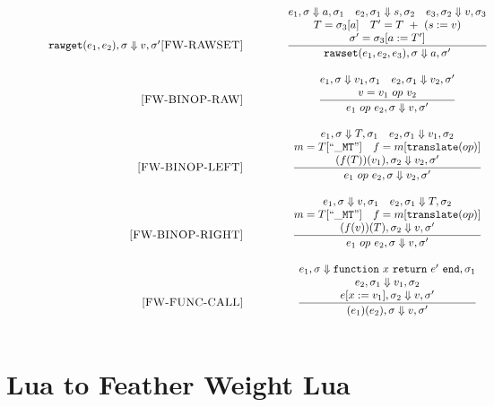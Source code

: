 \documentclass{article}
\begin{document}
\begin{figure}[P]
\[\begin{array}{r@{\qquad\qquad}c}
{}{
  \semanticFull {{\tt rawget}(e_1,e_2)} {\sigma}   {v} {\sigma'}
}
\ssrule{FW-RAWSET}{
  \semanticFull{e_1}{\sigma}{a}{\sigma_1} \quad
  \semanticFull{e_2}{\sigma_1}{s}{\sigma_2} \quad
  \semanticFull{e_3}{\sigma_2}{v}{\sigma_3} \\
  T = \sigma_3[a] \quad
  T' = T~+~(s := v) \\
  \sigma' = \sigma_3[a:=T']
}{
  \semanticFull{{\tt rawset}(e_1,e_2,e_3)}{\sigma}{a}{\sigma'}
}
\ssrule{FW-BINOP-RAW}{
  \semanticFull{e_1}{\sigma}{v_1}{\sigma_1} \quad
  \semanticFull{e_2}{\sigma_1}{v_2}{\sigma'} \\
  v = v_1 ~op~ v_2
}{
  \semanticFull{e_1 ~op~ e_2}{\sigma}{v}{\sigma'}
}
\ssrule{FW-BINOP-LEFT}{
  \semanticFull{e_1}{\sigma}{T}{\sigma_1} \quad
  \semanticFull{e_2}{\sigma_1}{v_1}{\sigma_2} \\
  m = T[{\tt ``{\_}MT"}]\quad
  f = m[{\tt translate}(op)]\\
   \semanticFull{(f(T))(v_1)}  {\sigma_2}    {v_2} {\sigma'} \\
}{
  \semanticFull{e_1 ~op~ e_2}{\sigma}{v_2}{\sigma'}
}
\ssrule{FW-BINOP-RIGHT}{
  \semanticFull{e_1}{\sigma}{v}{\sigma_1} \quad
  \semanticFull{e_2}{\sigma_1}{T}{\sigma_2} \\
  m = T[{\tt ``{\_}MT"}]\quad
  f = m[{\tt translate}(op)]\\
   \semanticFull{(f(v))(T)}  {\sigma_2}    {v} {\sigma'} \\
}{
  \semanticFull{e_1 ~op~ e_2}{\sigma}{v}{\sigma'}
}
\ssrule{FW-FUNC-CALL}{
  \semanticFull{e_1}{\sigma}{{\tt function} ~x ~{\tt return}~e' ~{\tt end}}{\sigma_1} \\
  \semanticFull{e_2}{\sigma_1}{v_1}{\sigma_2} \\
  \semanticFull{e[x:=v_1]}{\sigma_2}{v}{\sigma'} 
}{
  \semanticFull{(e_1)(e_2)}{\sigma}{v}{\sigma'} 
}
\end{array}
\]
\end{figure}

\newcommand{\desugar}[2]{{#1} & \xlongequal[]{def} & {\begin{array}{@{}l@{}} #2 \end{array}}\\}

\section{Lua to Feather Weight Lua}
\end{document}
